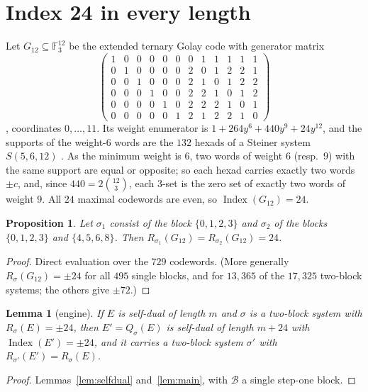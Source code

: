 \documentclass[11pt]{amsart}
\newtheorem{lemma}[theorem]{Lemma}
\newtheorem{proposition}[theorem]{Proposition}
\theoremstyle{definition}
\newcommand{\F}{\mathbb{F}_3}
\newcommand{\Index}{\operatorname{Index}}
\newcommand{\cB}{\mathcal{B}}
\begin{document}
\section{Index 24 in every length}\label{sec:existence}

Let $G_{12}\subseteq\F^{12}$ be the extended ternary Golay code with generator matrix
\[
\begin{pmatrix}
1&0&0&0&0&0&0&1&1&1&1&1\\
0&1&0&0&0&0&2&0&1&2&2&1\\
0&0&1&0&0&0&2&1&0&1&2&2\\
0&0&0&1&0&0&2&2&1&0&1&2\\
0&0&0&0&1&0&2&2&2&1&0&1\\
0&0&0&0&0&1&2&1&2&2&1&0
\end{pmatrix}
\]
\cite[Ex.~1.5]{GJF}, coordinates $0,\dots,11$. Its weight enumerator is
$1+264y^6+440y^9+24y^{12}$, and the supports of the weight-$6$ words are the $132$ hexads of a
Steiner system $S(5,6,12)$ \cite[Ch.~10, 11]{CS}. As the minimum weight is $6$, two words of weight
$6$ (resp.\ $9$) with the same support are equal or opposite; so each hexad carries exactly two words
$\pm c$, and, since $440=2\binom{12}{3}$, each $3$-set is the zero set of exactly two words of weight
$9$. All $24$ maximal codewords are even, so $\Index(G_{12})=24$.

\begin{proposition}\label{prop:base}
Let $\sigma_1$ consist of the block $\{0,1,2,3\}$ and $\sigma_2$ of the blocks $\{0,1,2,3\}$ and
$\{4,5,6,8\}$. Then $R_{\sigma_1}(G_{12})=R_{\sigma_2}(G_{12})=24$.
\end{proposition}

\begin{proof}
Direct evaluation over the $729$ codewords. (More generally $R_\sigma(G_{12})=\pm24$ for all $495$
single blocks, and for $13{,}365$ of the $17{,}325$ two-block systems; the others give $\pm72$.)
\end{proof}

\begin{lemma}[engine]\label{lem:engine}
If $E$ is self-dual of length $m$ and $\sigma$ is a two-block system with $R_\sigma(E)=\pm24$, then
$E'=Q_\sigma(E)$ is self-dual of length $m+24$ with $\Index(E')=\pm24$, and it carries a two-block
system $\sigma'$ with $R_{\sigma'}(E')=R_\sigma(E)$.
\end{lemma}

\begin{proof}
Lemmas~\ref{lem:selfdual} and~\ref{lem:main}, with $\cB$ a single step-one block.
\end{proof}
\end{document}
